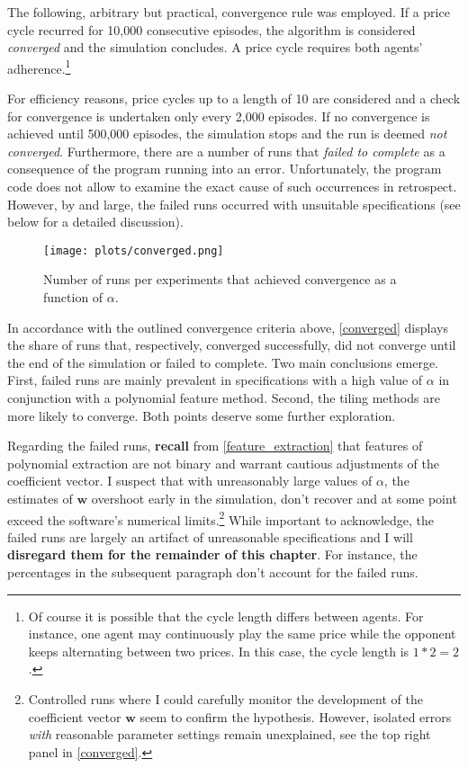 The following, arbitrary but practical, convergence rule was employed. If a price cycle recurred for 10,000 consecutive episodes, the algorithm is considered \emph{converged} and the simulation concludes. A price cycle requires both agents' adherence.\footnote{Of course it is possible that the cycle length differs between agents. For instance, one agent may continuously play the same price while the opponent keeps alternating between two prices. In this case, the cycle length is $1*2=2$.}

For efficiency reasons, price cycles up to a length of 10 are considered and a check for convergence is undertaken only every 2,000 episodes. If no convergence is achieved until 500,000 episodes, the simulation stops and the run is deemed \emph{not converged}. Furthermore, there are a number of runs that \emph{failed to complete} as a consequence of the program running into an error. Unfortunately, the program code does not allow to examine the exact cause of such occurrences in retrospect. However, by and large, the failed runs occurred with unsuitable specifications (see below for a detailed discussion).

\begin{figure}
	\texttt{[image: plots/converged.png]}
	\caption{Number of runs per experiments that achieved convergence as a function of $\alpha$.}
	\label{converged}
\end{figure}

In accordance with the outlined convergence criteria above, \autoref{converged} displays the share of runs that, respectively, converged successfully, did not converge until the end of the simulation or failed to complete. Two main conclusions emerge. First, failed runs are mainly prevalent in specifications with a high value of $\alpha$ in conjunction with a polynomial feature method. Second, the tiling methods are more likely to converge. Both points deserve some further exploration.

Regarding the failed runs, \textbf{recall} from \autoref{feature_extraction} that features of polynomial extraction are not binary and warrant cautious adjustments of the coefficient vector. I suspect that with unreasonably large values of $\alpha$, the estimates of $\boldsymbol{w}$ overshoot early in the simulation, don't recover and at some point exceed the software's numerical limits.\footnote{Controlled runs where I could carefully monitor the development of the coefficient vector $\boldsymbol{w}$ seem to confirm the hypothesis. However, isolated errors \emph{with} reasonable parameter settings remain unexplained, see the top right panel in \autoref{converged}.} While important to acknowledge, the failed runs are largely an artifact of unreasonable specifications and I will \textbf{disregard them for the remainder of this chapter}. For instance, the percentages in the subsequent paragraph don't account for the failed runs.

